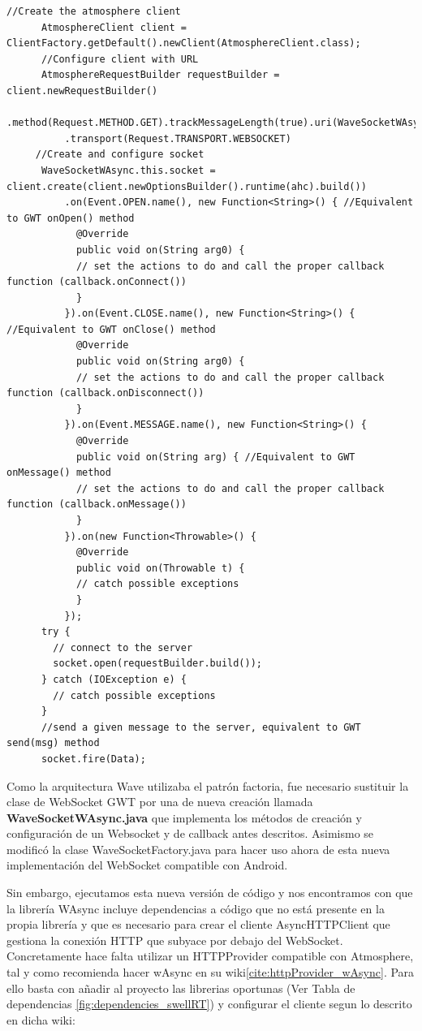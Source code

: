 	  \begin{lstlisting}[frame=single]	  	  
	  //Create the atmosphere client
	  AtmosphereClient client = ClientFactory.getDefault().newClient(AtmosphereClient.class);
	  //Configure client with URL
      AtmosphereRequestBuilder requestBuilder = client.newRequestBuilder()
          .method(Request.METHOD.GET).trackMessageLength(true).uri(WaveSocketWAsync.this.urlBase)
          .transport(Request.TRANSPORT.WEBSOCKET)
	 //Create and configure socket
      WaveSocketWAsync.this.socket = client.create(client.newOptionsBuilder().runtime(ahc).build())
          .on(Event.OPEN.name(), new Function<String>() { //Equivalent to GWT onOpen() method
            @Override
            public void on(String arg0) {
			// set the actions to do and call the proper callback function (callback.onConnect())
            }
          }).on(Event.CLOSE.name(), new Function<String>() { //Equivalent to GWT onClose() method
            @Override
            public void on(String arg0) {
            // set the actions to do and call the proper callback function (callback.onDisconnect())
            }
          }).on(Event.MESSAGE.name(), new Function<String>() {
            @Override
            public void on(String arg) { //Equivalent to GWT onMessage() method
            // set the actions to do and call the proper callback function (callback.onMessage())
            }
          }).on(new Function<Throwable>() {
            @Override
            public void on(Throwable t) {
   			// catch possible exceptions
            }
          });
      try {
      	// connect to the server
        socket.open(requestBuilder.build());
      } catch (IOException e) {
		// catch possible exceptions
      } 
      //send a given message to the server, equivalent to GWT send(msg) method 
      socket.fire(Data);
	\end{lstlisting}
	
	Como la arquitectura Wave utilizaba el patrón factoria, fue necesario sustituir la clase de WebSocket GWT por una de nueva creación llamada \textbf{WaveSocketWAsync.java}\cite{ref:wave_migration_github} que implementa los métodos de creación y configuración de un Websocket y de callback antes descritos. Asimismo se modificó la clase WaveSocketFactory.java para hacer uso ahora de esta nueva implementación del WebSocket compatible con Android. 
	
	Sin embargo, ejecutamos esta nueva versión de código y nos encontramos con que la librería WAsync incluye dependencias a código que no está presente en la propia librería y que es necesario para crear el cliente AsyncHTTPClient que gestiona la conexión HTTP que subyace por debajo del WebSocket. Concretamente hace falta utilizar un HTTPProvider compatible con Atmosphere, tal y como recomienda hacer wAsync en su wiki\ref{cite:httpProvider_wAsync}. Para ello basta con añadir al proyecto las librerias oportunas (Ver Tabla de dependencias \ref{fig:dependencies_swellRT}) y configurar el cliente segun lo descrito en dicha wiki:
		
